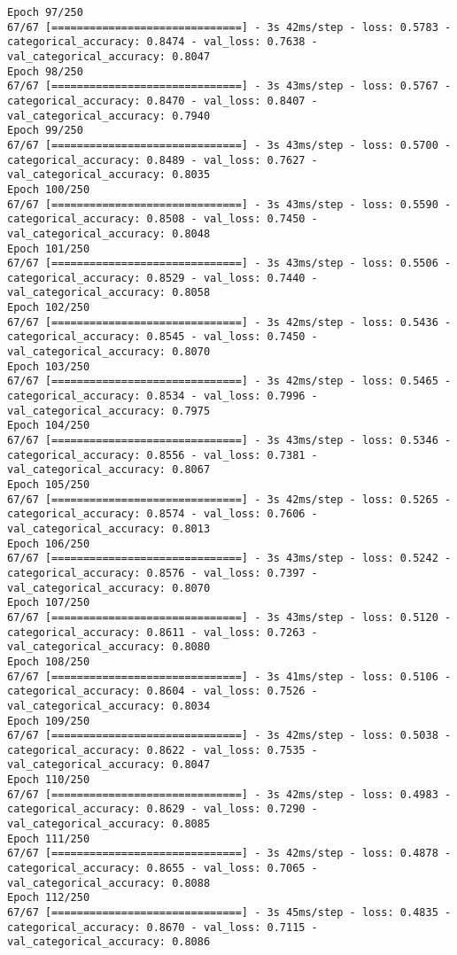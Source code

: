\begin{lstlisting}
Epoch 97/250
67/67 [==============================] - 3s 42ms/step - loss: 0.5783 - categorical_accuracy: 0.8474 - val_loss: 0.7638 - val_categorical_accuracy: 0.8047
Epoch 98/250
67/67 [==============================] - 3s 43ms/step - loss: 0.5767 - categorical_accuracy: 0.8470 - val_loss: 0.8407 - val_categorical_accuracy: 0.7940
Epoch 99/250
67/67 [==============================] - 3s 43ms/step - loss: 0.5700 - categorical_accuracy: 0.8489 - val_loss: 0.7627 - val_categorical_accuracy: 0.8035
Epoch 100/250
67/67 [==============================] - 3s 43ms/step - loss: 0.5590 - categorical_accuracy: 0.8508 - val_loss: 0.7450 - val_categorical_accuracy: 0.8048
Epoch 101/250
67/67 [==============================] - 3s 43ms/step - loss: 0.5506 - categorical_accuracy: 0.8529 - val_loss: 0.7440 - val_categorical_accuracy: 0.8058
Epoch 102/250
67/67 [==============================] - 3s 42ms/step - loss: 0.5436 - categorical_accuracy: 0.8545 - val_loss: 0.7450 - val_categorical_accuracy: 0.8070
Epoch 103/250
67/67 [==============================] - 3s 42ms/step - loss: 0.5465 - categorical_accuracy: 0.8534 - val_loss: 0.7996 - val_categorical_accuracy: 0.7975
Epoch 104/250
67/67 [==============================] - 3s 43ms/step - loss: 0.5346 - categorical_accuracy: 0.8556 - val_loss: 0.7381 - val_categorical_accuracy: 0.8067
Epoch 105/250
67/67 [==============================] - 3s 42ms/step - loss: 0.5265 - categorical_accuracy: 0.8574 - val_loss: 0.7606 - val_categorical_accuracy: 0.8013
Epoch 106/250
67/67 [==============================] - 3s 43ms/step - loss: 0.5242 - categorical_accuracy: 0.8576 - val_loss: 0.7397 - val_categorical_accuracy: 0.8070
Epoch 107/250
67/67 [==============================] - 3s 43ms/step - loss: 0.5120 - categorical_accuracy: 0.8611 - val_loss: 0.7263 - val_categorical_accuracy: 0.8080
Epoch 108/250
67/67 [==============================] - 3s 41ms/step - loss: 0.5106 - categorical_accuracy: 0.8604 - val_loss: 0.7526 - val_categorical_accuracy: 0.8034
Epoch 109/250
67/67 [==============================] - 3s 42ms/step - loss: 0.5038 - categorical_accuracy: 0.8622 - val_loss: 0.7535 - val_categorical_accuracy: 0.8047
Epoch 110/250
67/67 [==============================] - 3s 42ms/step - loss: 0.4983 - categorical_accuracy: 0.8629 - val_loss: 0.7290 - val_categorical_accuracy: 0.8085
Epoch 111/250
67/67 [==============================] - 3s 42ms/step - loss: 0.4878 - categorical_accuracy: 0.8655 - val_loss: 0.7065 - val_categorical_accuracy: 0.8088
Epoch 112/250
67/67 [==============================] - 3s 45ms/step - loss: 0.4835 - categorical_accuracy: 0.8670 - val_loss: 0.7115 - val_categorical_accuracy: 0.8086

\end{lstlisting}
